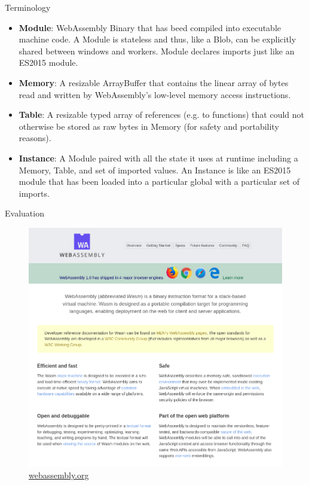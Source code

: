 \documentclass{beamer}
\begin{document}
\begin{frame}{Terminology}
    \begin{itemize}
        \item \textbf{Module}: WebAssembly Binary that has beed compiled into executable machine code. A Module is stateless and thus, like a Blob, can be explicitly shared between windows and workers. Module declares imports just like an ES2015 module.
        \item \textbf{Memory}: A resizable ArrayBuffer that contains the linear array of bytes read and written by WebAssembly’s low-level memory access instructions.
        \item \textbf{Table}: A resizable typed array of references (e.g. to functions) that could not otherwise be stored as raw bytes in Memory (for safety and portability reasons).
        \item \textbf{Instance}: A Module paired with all the state it uses at runtime including a Memory, Table, and set of imported values. An Instance is like an ES2015 module that has been loaded into a particular global with a particular set of imports.
    \end{itemize}
\end{frame}

\begin{frame}{Evaluation}
    \begin{figure}
        \includegraphics[scale=0.2]{./images/webassembly_org.png}
        \caption{\href{https://webassembly.org/}{webassembly.org}}
    \end{figure}
\end{frame}
\end{document}

